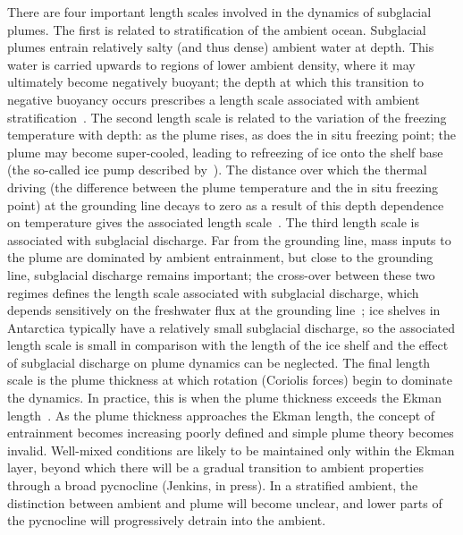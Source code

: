 \documentclass[openacc]{rsproca_new}%
\begin{document}
There are four important length scales involved in the dynamics of subglacial plumes. The first is related to stratification of the ambient ocean. Subglacial plumes entrain relatively salty (and thus dense) ambient water at depth. This water  is carried upwards to regions of lower ambient density, where it may ultimately become negatively buoyant; the depth at which this transition to negative buoyancy occurs prescribes a length scale associated with ambient stratification~\citep{Magorrian2016JGeoResOcean}. The second length scale is related to the variation of the freezing temperature with depth: as the plume rises, as does the in situ freezing point; the plume may become super-cooled, leading to refreezing of ice onto the shelf base (the so-called ice pump described by~\cite{Lewis1986JGeophysResOceans}). The distance over which the thermal driving (the difference between the plume temperature and the in situ freezing point) at the grounding line decays to zero as a result of this depth dependence on temperature gives the associated length scale~\citep{LaneSerff1995JGeophysResOceans}. The third length scale is associated with subglacial discharge. Far from the grounding line, mass inputs to the plume are dominated by ambient entrainment, but close to the grounding line, subglacial discharge remains important; the cross-over between these two regimes defines the length scale associated with subglacial discharge, which depends sensitively on the freshwater flux at the grounding line~\citep{Jenkins2011JPhysOcean}; ice shelves in Antarctica typically have a relatively small subglacial discharge, so the associated length scale is small in comparison with the length of the ice shelf and the effect of subglacial discharge on plume dynamics can be neglected. The final length scale is the plume thickness at which rotation (Coriolis forces) begin to dominate the dynamics. In practice, this is when the plume thickness exceeds the Ekman length~\citep{Jenkins2011JPhysOcean}. As the plume thickness approaches the Ekman length, the concept of entrainment becomes increasing poorly defined and simple plume theory becomes invalid.  Well-mixed conditions are likely to be maintained only within the Ekman layer, beyond which there will be a gradual transition to ambient properties through a broad pycnocline (Jenkins, in press).  In a stratified ambient, the distinction between ambient and plume will become unclear, and lower parts of the pycnocline will progressively detrain into the ambient.
\end{document}
